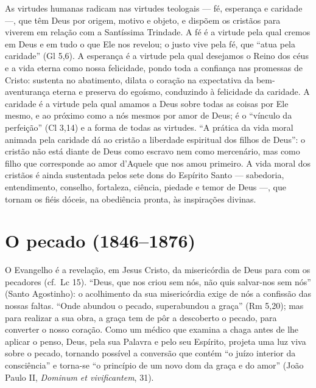 As virtudes humanas radicam nas virtudes teologais --- fé, esperança e caridade ---, que têm Deus por origem, motivo e objeto, e dispõem os cristãos para viverem em relação com a Santíssima Trindade. A fé é a virtude pela qual cremos em Deus e em tudo o que Ele nos revelou; o justo vive pela fé, que ``atua pela caridade'' (Gl 5,6). A esperança é a virtude pela qual desejamos o Reino dos céus e a vida eterna como nossa felicidade, pondo toda a confiança nas promessas de Cristo: sustenta no abatimento, dilata o coração na expectativa da bem-aventurança eterna e preserva do egoísmo, conduzindo à felicidade da caridade. A caridade é a virtude pela qual amamos a Deus sobre todas as coisas por Ele mesmo, e ao próximo como a nós mesmos por amor de Deus; é o ``vínculo da perfeição'' (Cl 3,14) e a forma de todas as virtudes. ``A prática da vida moral animada pela caridade dá ao cristão a liberdade espiritual dos filhos de Deus'': o cristão não está diante de Deus como escravo nem como mercenário, mas como filho que corresponde ao amor d'Aquele que nos amou primeiro. A vida moral dos cristãos é ainda sustentada pelos sete dons do Espírito Santo --- sabedoria, entendimento, conselho, fortaleza, ciência, piedade e temor de Deus ---, que tornam os fiéis dóceis, na obediência pronta, às inspirações divinas.

\section{O pecado (1846--1876)}

O Evangelho é a revelação, em Jesus Cristo, da misericórdia de Deus para com os pecadores (cf.~Lc 15). ``Deus, que nos criou sem nós, não quis salvar-nos sem nós'' (Santo Agostinho): o acolhimento da sua misericórdia exige de nós a confissão das nossas faltas. ``Onde abundou o pecado, superabundou a graça'' (Rm 5,20); mas para realizar a sua obra, a graça tem de pôr a descoberto o pecado, para converter o nosso coração. Como um médico que examina a chaga antes de lhe aplicar o penso, Deus, pela sua Palavra e pelo seu Espírito, projeta uma luz viva sobre o pecado, tornando possível a conversão que contém ``o juízo interior da consciência'' e torna-se ``o princípio de um novo dom da graça e do amor'' (João Paulo II, \textit{Dominum et vivificantem}, 31).

